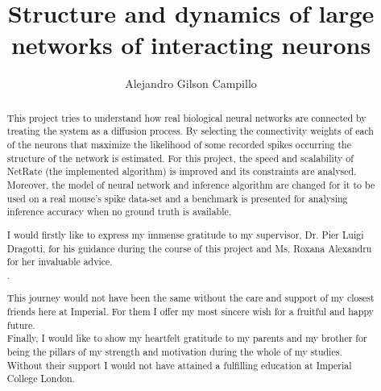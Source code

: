 \documentclass[a4paper, twoside]{report}
\title{Structure and dynamics of large networks of interacting neurons}
\author{Alejandro Gilson Campillo}
\begin{document}


\begin{abstract}
This project tries to understand how real biological neural networks are connected by treating the system as a diffusion process. By selecting the connectivity weights of each of the neurons that maximize the likelihood of some recorded spikes occurring  the structure of the network is estimated. For this project, the speed and scalability of NetRate (the implemented algorithm) is improved and its constraints are analysed. Moreover, the model of neural network and inference algorithm are changed for it to be used on a real mouse’s spike data-set and a benchmark is presented for analysing inference accuracy when no ground truth is available.
\end{abstract}

\renewcommand{\abstractname}{Acknowledgements}
\begin{abstract}
I would firstly like to express my immense gratitude to my supervisor, Dr. Pier Luigi Dragotti, for his guidance during the course of this project and Ms. Roxana Alexandru for her invaluable advice.\\.

This journey would not have been the same without the care and support of my closest friends here at Imperial. For them I offer my most sincere wish for a fruitful and happy future.\\

Finally, I would like to show my heartfelt gratitude to my parents and my brother for being the pillars of my strength and motivation during the whole of my studies. Without their support I would not have attained a fulfilling education at Imperial College London. 
\end{abstract}

\tableofcontents
\listoffigures
\listoftables












\printbibliography 
% 
% 
\end{document}
